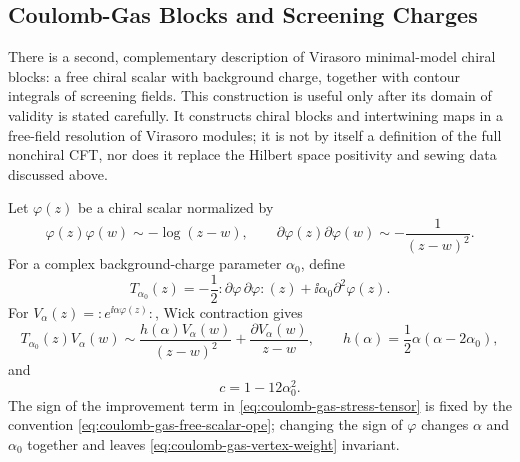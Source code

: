 \subsection{Coulomb-Gas Blocks and Screening Charges}
\label{subsec:minimal-model-coulomb-gas}

There is a second, complementary description of Virasoro minimal-model chiral
blocks: a free chiral scalar with background charge, together with contour
integrals of screening fields.  This construction is useful only after its
domain of validity is stated carefully.  It constructs chiral blocks and
intertwining maps in a free-field resolution of Virasoro modules; it is not by
itself a definition of the full nonchiral CFT, nor does it replace the Hilbert
space positivity and sewing data discussed above.

Let \(\varphi(z)\) be a chiral scalar normalized by
\begin{equation}
  \varphi(z)\varphi(w)\sim-\log(z-w),
  \qquad
  \partial\varphi(z)\partial\varphi(w)\sim-\frac1{(z-w)^2}.
  \label{eq:coulomb-gas-free-scalar-ope}
\end{equation}
For a complex background-charge parameter \(\alpha_0\), define
\begin{equation}
  T_{\alpha_0}(z)
  =
  -\frac12:\partial\varphi\,\partial\varphi:(z)
  +\ii\alpha_0\partial^2\varphi(z).
  \label{eq:coulomb-gas-stress-tensor}
\end{equation}
For \(V_\alpha(z)=:e^{\ii\alpha\varphi(z)}:\), Wick contraction gives
\begin{equation}
  T_{\alpha_0}(z)V_\alpha(w)
  \sim
  \frac{h(\alpha)V_\alpha(w)}{(z-w)^2}
  +
  \frac{\partial V_\alpha(w)}{z-w},
  \qquad
  h(\alpha)=\frac12\alpha(\alpha-2\alpha_0),
  \label{eq:coulomb-gas-vertex-weight}
\end{equation}
and
\begin{equation}
  c=1-12\alpha_0^2.
  \label{eq:coulomb-gas-central-charge}
\end{equation}
The sign of the improvement term in
\eqref{eq:coulomb-gas-stress-tensor} is fixed by the convention
\eqref{eq:coulomb-gas-free-scalar-ope}; changing the sign of
\(\varphi\) changes \(\alpha\) and \(\alpha_0\) together and leaves
\eqref{eq:coulomb-gas-vertex-weight} invariant.

